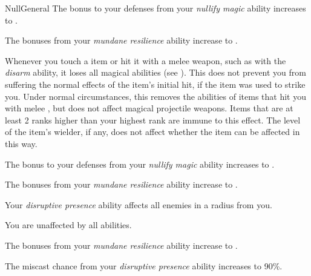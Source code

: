 \begin{feat}{Null}{General}
         The bonus to your defenses from your \textit{nullify magic} ability increases to .

         The bonuses from your \textit{mundane resilience} ability increase to .

         Whenever you touch a  item or hit it with a melee weapon, such as with the \textit{disarm} ability, it  loses all magical abilities (see ).
        This does not prevent you from suffering the normal effects of the item's initial hit, if the item was used to strike you.
        Under normal circumstances, this removes the abilities of items that hit you with melee , but does not affect magical projectile weapons.
        Items that are at least 2 ranks higher than your highest rank are immune to this effect.
        The level of the item's wielder, if any, does not affect whether the item can be affected in this way.

         The bonus to your defenses from your \textit{nullify magic} ability increases to .

         The bonuses from your \textit{mundane resilience} ability increase to .

         Your \textit{disruptive presence} ability affects all enemies in a \areahuge radius  from you.

         You are unaffected by all  abilities.

         The bonuses from your \textit{mundane resilience} ability increase to .

         The miscast chance from your \textit{disruptive presence} ability increases to 90\%.
    \end{feat}

